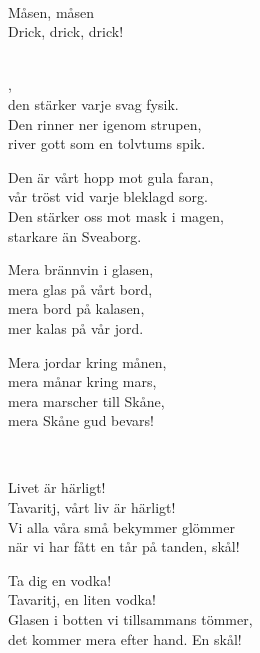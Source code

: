 \newpage


\vspace{0.15cm}
\melochtext{} \\
\songtext{}Måsen, måsen\\
Drick, drick, drick! \\


 \\       

,\\
den stärker varje svag fysik.\\
Den rinner ner igenom strupen,\\
river gott som en tolvtums spik.

Den är vårt hopp mot gula faran,\\
vår tröst vid varje bleklagd sorg.\\
Den stärker oss mot mask i magen,\\
starkare än Sveaborg.

Mera brännvin i glasen,\\
mera glas på vårt bord,\\
mera bord på kalasen,\\
mer kalas på vår jord.

Mera jordar kring månen,\\
mera månar kring mars,\\
mera marscher till Skåne,\\
mera Skåne gud bevars!\\

\newpage 


 \\       

\songtext{}
Livet är härligt!\\
Tavaritj, vårt liv är härligt!\\
Vi alla våra små bekymmer glömmer\\
när vi har fått en tår på tanden, skål!

Ta dig en vodka!\\
Tavaritj, en liten vodka!\\
Glasen i botten vi tillsammans tömmer,\\
det kommer mera efter hand. En skål!

